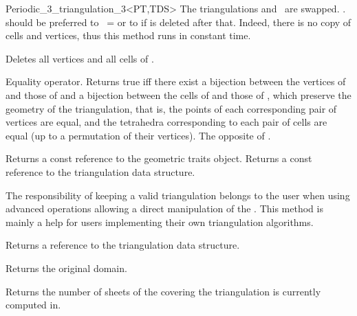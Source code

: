 \begin{ccRefClass}{Periodic_3_triangulation_3<PT,TDS>}
{The triangulations  and \ccVar\ are swapped.
\ccVar. should be preferred to \ccVar\ =  or to
 if  is deleted after that. Indeed, there is no
copy of cells and vertices, thus this method runs in constant time.}

{Deletes all vertices and all cells of \ccVar.}

{Equality operator.  Returns true iff there exist a bijection between the
vertices of  and those of  and a bijection between the cells of
 and those of , which preserve the geometry of the
triangulation, that is, the points of each corresponding pair of vertices are
equal, and the tetrahedra corresponding to each pair of cells are equal (up to
a permutation of their vertices).}
\ccGlue
{}
{The opposite of .}

\ccAccessFunctions


{Returns a const reference to the geometric traits object.}
\ccGlue
{}
{Returns a const reference to the triangulation data structure.}

\begin{ccAdvanced}
The responsibility of keeping a valid triangulation belongs to the user
when using advanced operations allowing a direct manipulation of the .
This method is mainly a help for users implementing their own triangulation
algorithms.

{Returns a reference to the triangulation data structure.}
\end{ccAdvanced}

{Returns the original domain.}

\begin{ccAdvanced}
{Returns the number of sheets of the covering the triangulation is
  currently computed in.} 


\end{ccAdvanced}
\end{ccRefClass}

